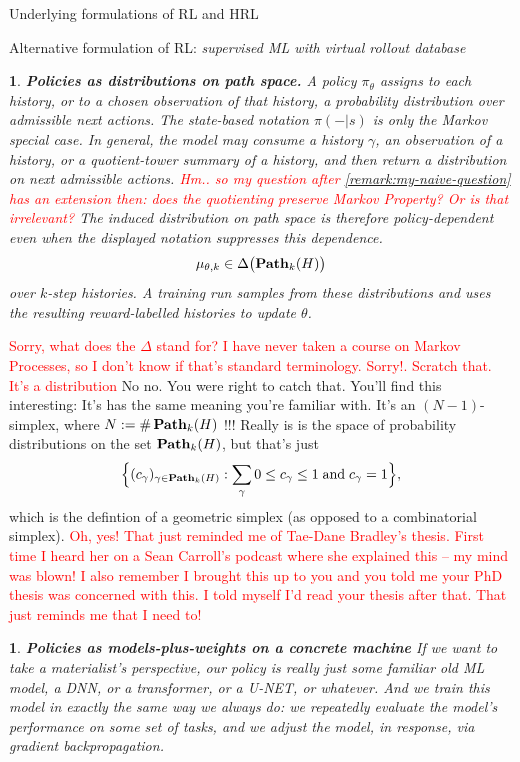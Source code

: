 \documentclass[11pt]{article}
\newtheorem{ermark}[subsubsection]{}
\begin{document}
\begin{section}{Underlying formulations of RL and HRL}
\begin{subsection}{Alternative formulation of RL: {\em supervised ML with virtual rollout database}}
\begin{ermark}
{\bf Policies as distributions on path space.}
\normalfont
A policy $\pi_\theta$ assigns to each history, or to a chosen observation of that history, a probability distribution over admissible next actions. The state-based notation $\pi(-|s)$ is only the Markov special case. In general, the model may consume a history $\gamma$, an observation of a history, or a quotient-tower summary of a history, and then return a distribution on next admissible actions. \textcolor{red}{Hm.. so my question after \ref{remark:my-naive-question} has an extension then: does the quotienting preserve Markov Property? Or is that irrelevant?} The induced distribution on path space is therefore policy-dependent even when the displayed notation suppresses this dependence.
\[
    \mu_{\theta,k}\in \Delta\big(\bold{Path}_k(H)\big)
\]
over $k$-step histories.  A training run samples from these distributions and uses the resulting reward-labelled histories to update $\theta$.
\end{ermark}
\textcolor{red}{Sorry, what does the $\Delta$ stand for? I have never taken a course on Markov Processes, so I don't know if that's standard terminology. Sorry!. Scratch that. It's a distribution} {\color{blue} No no. You were right to catch that. You'll find this interesting: It's has the same meaning you're familiar with. It's an $(N-1)$-simplex, where $N:=\#\,\bold{Path}_{k}(H)$ !!! Really is is the space of probability distributions on the set $\bold{Path}_{k}(H)$, but that's just
$$
\Big\{(c_{\gamma})_{\gamma\in\bold{Path}_{k}(H)}:\sum_{\gamma}0\le c_{\gamma}\le 1\;\text{and}\;c_{\gamma}=1\Big\},
$$
which is the defintion of a geometric simplex (as opposed to a combinatorial simplex).}
\textcolor{red}{Oh, yes! That just reminded me of Tae-Dane Bradley's thesis\cite{bradley2020interface}. First time I heard her on a Sean Carroll's podcast where she explained this -- my mind was blown! I also remember I brought this up to you and you told me your PhD thesis was concerned with this. I told myself I'd read your thesis after that. That just reminds me that I need to!}
\begin{ermark}
{\bf Policies as models-plus-weights on a concrete machine}
\normalfont
If we want to take a materialist's perspective, our policy is {\em really} just some familiar old ML model, a DNN, or a transformer, or a U-NET, or whatever.  And we train this model in exactly the same way we always do: we repeatedly evaluate the model’s performance on some set of tasks, and we adjust the model, in response, via gradient backpropagation.


\end{ermark}
\end{subsection}
\end{section}
\end{document}
